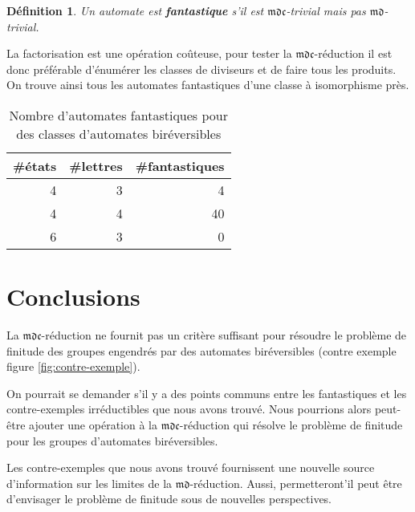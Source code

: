 \documentclass[11pt,a4paper]{article}
\newtheorem{definition}{Définition}
\begin{document}
\begin{definition}
  Un automate est \textbf{\textit{fantastique}} s'il est $\mathfrak{mdc}$-trivial mais pas $\mathfrak{md}$-trivial.
\end{definition}

La factorisation est une opération coûteuse, pour tester la $\mathfrak{mdc}$-réduction il est donc préférable d'énumérer les classes de diviseurs et de faire tous les produits. On trouve ainsi tous les automates fantastiques d'une classe à isomorphisme près.

\begin{table}[h!]
  \begin{center}
    \begin{threeparttable}
      \begin{tabular}{|rrr|}
        \hline
        \#états & \#lettres & \#fantastiques \\ [0.5ex]
        \hline\hline
        \hline
        4 & 3 & 4 \\
        \hline
        4 & 4 & 40 \\
        \hline
        6 & 3 & 0 \\
        \hline
      \end{tabular}
      \caption{Nombre d'automates fantastiques pour des classes d'automates biréversibles}
    \end{threeparttable}
  \end{center}
\end{table}

\section{Conclusions}

La $\mathfrak{mdc}$-réduction ne fournit pas un critère suffisant pour résoudre le problème de finitude des groupes engendrés par des automates biréversibles (contre exemple figure \ref{fig:contre-exemple}).

On pourrait se demander s'il y a des points communs entre les fantastiques et les contre-exemples irréductibles que nous avons trouvé. Nous pourrions alors peut-être ajouter une opération à la $\mathfrak{mdc}$-réduction qui résolve le problème de finitude pour les groupes d'automates biréversibles.

Les contre-exemples que nous avons trouvé fournissent une nouvelle source d'information sur les limites de la $\mathfrak{md}$-réduction. Aussi, permetteront'il peut être d'envisager le problème de finitude sous de nouvelles perspectives.


\newpage
{
  \nocite{*}
}

\end{document}
